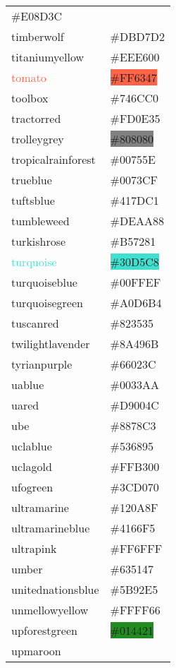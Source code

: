 \documentclass[
]{article}
\begin{document}
\begin{longtable}[]{@{}ll@{}}
\colorbox{tigerseye}{\#E08D3C}\tabularnewline
\textcolor{timberwolf}{timberwolf} &
\colorbox{timberwolf}{\#DBD7D2}\tabularnewline
\textcolor{titaniumyellow}{titaniumyellow} &
\colorbox{titaniumyellow}{\#EEE600}\tabularnewline
\textcolor{tomato}{tomato} & \colorbox{tomato}{\#FF6347}\tabularnewline
\textcolor{toolbox}{toolbox} &
\colorbox{toolbox}{\#746CC0}\tabularnewline
\textcolor{tractorred}{tractorred} &
\colorbox{tractorred}{\#FD0E35}\tabularnewline
\textcolor{trolleygrey}{trolleygrey} &
\colorbox{gray}{\#808080}\tabularnewline
\textcolor{tropicalrainforest}{tropicalrainforest} &
\colorbox{tropicalrainforest}{\#00755E}\tabularnewline
\textcolor{trueblue}{trueblue} &
\colorbox{trueblue}{\#0073CF}\tabularnewline
\textcolor{tuftsblue}{tuftsblue} &
\colorbox{tuftsblue}{\#417DC1}\tabularnewline
\textcolor{tumbleweed}{tumbleweed} &
\colorbox{tumbleweed}{\#DEAA88}\tabularnewline
\textcolor{turkishrose}{turkishrose} &
\colorbox{turkishrose}{\#B57281}\tabularnewline
\textcolor{turquoise}{turquoise} &
\colorbox{turquoise}{\#30D5C8}\tabularnewline
\textcolor{turquoiseblue}{turquoiseblue} &
\colorbox{turquoiseblue}{\#00FFEF}\tabularnewline
\textcolor{turquoisegreen}{turquoisegreen} &
\colorbox{turquoisegreen}{\#A0D6B4}\tabularnewline
\textcolor{tuscanred}{tuscanred} &
\colorbox{tuscanred}{\#823535}\tabularnewline
\textcolor{twilightlavender}{twilightlavender} &
\colorbox{twilightlavender}{\#8A496B}\tabularnewline
\textcolor{tyrianpurple}{tyrianpurple} &
\colorbox{tyrianpurple}{\#66023C}\tabularnewline
\textcolor{uablue}{uablue} & \colorbox{uablue}{\#0033AA}\tabularnewline
\textcolor{uared}{uared} & \colorbox{uared}{\#D9004C}\tabularnewline
\textcolor{ube}{ube} & \colorbox{ube}{\#8878C3}\tabularnewline
\textcolor{uclablue}{uclablue} &
\colorbox{uclablue}{\#536895}\tabularnewline
\textcolor{uclagold}{uclagold} &
\colorbox{uclagold}{\#FFB300}\tabularnewline
\textcolor{ufogreen}{ufogreen} &
\colorbox{ufogreen}{\#3CD070}\tabularnewline
\textcolor{ultramarine}{ultramarine} &
\colorbox{ultramarine}{\#120A8F}\tabularnewline
\textcolor{ultramarineblue}{ultramarineblue} &
\colorbox{ultramarineblue}{\#4166F5}\tabularnewline
\textcolor{ultrapink}{ultrapink} &
\colorbox{ultrapink}{\#FF6FFF}\tabularnewline
\textcolor{umber}{umber} & \colorbox{umber}{\#635147}\tabularnewline
\textcolor{unitednationsblue}{unitednationsblue} &
\colorbox{unitednationsblue}{\#5B92E5}\tabularnewline
\textcolor{unmellowyellow}{unmellowyellow} &
\colorbox{unmellowyellow}{\#FFFF66}\tabularnewline
\textcolor{upforestgreen}{upforestgreen} &
\colorbox{forestgreen}{\#014421}\tabularnewline
\textcolor{upmaroon}{upmaroon} &

\end{longtable}
\end{document}
